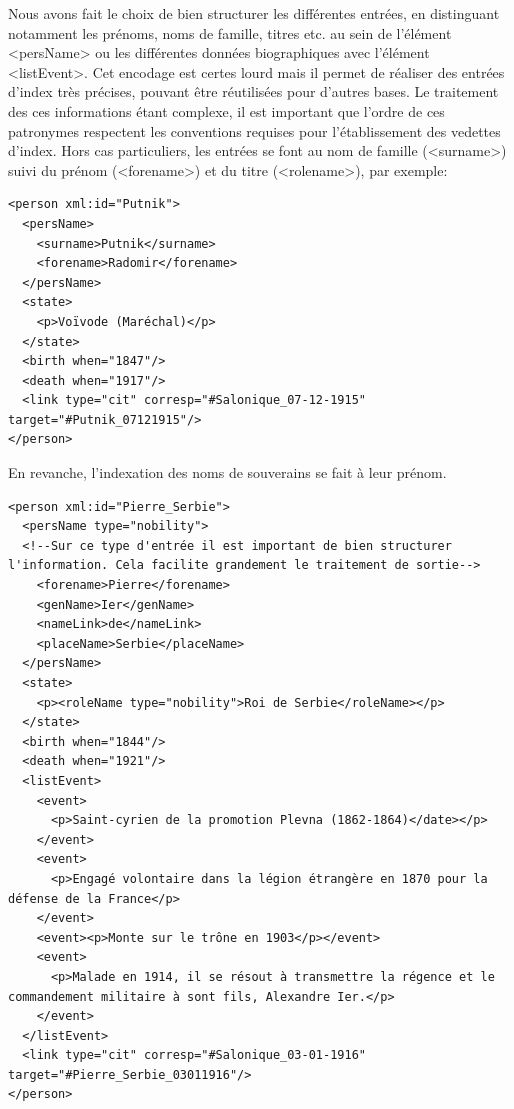 \documentclass[12pt,a4paper]{book} %
\begin{document}
Nous avons fait le choix de bien structurer les différentes entrées, en distinguant notamment les prénoms, noms de famille, titres etc. au sein de l'élément <persName> ou les différentes données biographiques avec l'élément <listEvent>. 
Cet encodage est certes lourd mais il permet de réaliser des entrées d'index très précises, pouvant être réutilisées pour d'autres bases. Le traitement des ces informations étant complexe, il est important que l'ordre de ces patronymes respectent les conventions requises pour l'établissement des vedettes d'index. Hors cas particuliers, les entrées se font au nom de famille (<surname>) suivi du prénom (<forename>) et du titre (<rolename>), par exemple: 
\bigskip 

\begin{lstlisting} 
<person xml:id="Putnik">
  <persName>
    <surname>Putnik</surname>
    <forename>Radomir</forename>                                                              
  </persName>
  <state>
    <p>Voïvode (Maréchal)</p>
  </state>
  <birth when="1847"/>
  <death when="1917"/>
  <link type="cit" corresp="#Salonique_07-12-1915" target="#Putnik_07121915"/>
</person>
\end{lstlisting}
\bigskip

En revanche, l'indexation des noms de souverains se fait à leur prénom.
\bigskip

\begin{lstlisting}
<person xml:id="Pierre_Serbie">
  <persName type="nobility">
  <!--Sur ce type d'entrée il est important de bien structurer l'information. Cela facilite grandement le traitement de sortie-->
    <forename>Pierre</forename>
    <genName>Ier</genName>
    <nameLink>de</nameLink> 
    <placeName>Serbie</placeName>                     
  </persName>
  <state>
    <p><roleName type="nobility">Roi de Serbie</roleName></p>
  </state>
  <birth when="1844"/>
  <death when="1921"/>                  
  <listEvent>                     
    <event>
      <p>Saint-cyrien de la promotion Plevna (1862-1864)</date></p>
    </event>
    <event>
      <p>Engagé volontaire dans la légion étrangère en 1870 pour la défense de la France</p>
    </event>
    <event><p>Monte sur le trône en 1903</p></event>
    <event>
      <p>Malade en 1914, il se résout à transmettre la régence et le commandement militaire à sont fils, Alexandre Ier.</p>
    </event>
  </listEvent>
  <link type="cit" corresp="#Salonique_03-01-1916" target="#Pierre_Serbie_03011916"/>                
</person>
\end{lstlisting}
\bigskip
\end{document}
